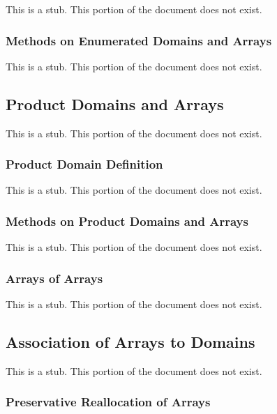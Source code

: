 This is a stub.  This portion of the document does not exist.

\subsubsection{Methods on Enumerated Domains and Arrays}
\label{Methods_on_Enumerated_Domains_and_Arrays}

This is a stub.  This portion of the document does not exist.

\subsection{Product Domains and Arrays}
\label{Product_Domains_and_Arrays}

This is a stub.  This portion of the document does not exist.

\subsubsection{Product Domain Definition}
\label{Product_Domain_Definition}

This is a stub.  This portion of the document does not exist.

\subsubsection{Methods on Product Domains and Arrays}
\label{Methods_on_Product_Domains_and_Arrays}

This is a stub.  This portion of the document does not exist.

\subsubsection{Arrays of Arrays}
\label{Arrays_of_Arrays}

This is a stub.  This portion of the document does not exist.

\subsection{Association of Arrays to Domains}
\label{Association_of_Arrays_to_Domains}

This is a stub.  This portion of the document does not exist.

\subsubsection{Preservative Reallocation of Arrays}
\label{Preservative_Reallocation_of_Arrays}

